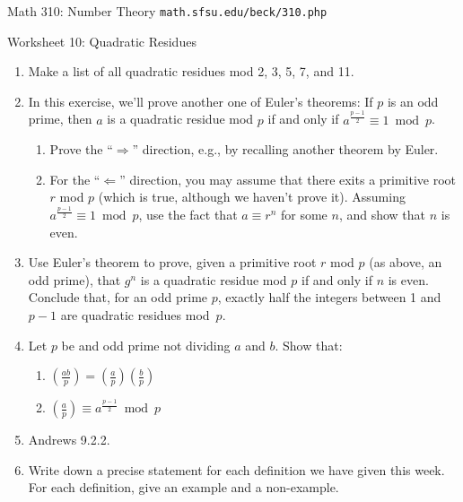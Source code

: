 \documentclass[11pt]{article}
\newcommand\leg[2]{\left( \frac{ #1 }{ #2 } \right)}
\begin{document}
\setlength{\parindent}{0pt}
\setlength{\parskip}{0.2cm}

{ Math 310: Number Theory}
\hfill
{\tt math.sfsu.edu/beck/310.php}

\vspace{.3in}

\begin{center}
\Large{Worksheet 10: Quadratic Residues}
\end{center}

\begin{enumerate}

\item Make a list of all quadratic residues mod 2, 3, 5, 7, and 11.

\item In this exercise, we'll prove another one of Euler's theorems:
If $p$ is an odd prime, then $a$ is a quadratic residue mod $p$ if and only if $a^{ \frac{ p-1 }{ 2 } } \equiv 1 \bmod p$.

  \begin{enumerate}

  \item Prove the ``$\Longrightarrow$'' direction, e.g., by recalling another theorem by Euler.

  \item For the ``$\Longleftarrow$'' direction, you may assume that there exits a primitive root $r$ mod $p$ (which is true, although we haven't prove it).
  Assuming $a^{ \frac{ p-1 }{ 2 } } \equiv 1 \bmod p$, use the fact that $a \equiv r^n$ for some $n$, and show that $n$ is even.

  \end{enumerate}

\item Use Euler's theorem to prove, given a primitive root $r$ mod $p$ (as above, an odd prime), that $g^n$ is a quadratic residue mod $p$ if and only if $n$ is even.
Conclude that, for an odd prime $p$, exactly half the integers between 1 and $p-1$ are quadratic residues mod~$p$.

\item Let $p$ be and odd prime not dividing $a$ and $b$. Show that:

  \begin{enumerate}

  \item $\leg{ab} p = \leg a p \leg b p$

  \item $\leg a p \equiv a^{ \frac{ p-1 }{ 2 } } \bmod p$
 
  \end{enumerate}

\item Andrews 9.2.2. 
 
\item Write down a precise statement for each definition we have given this week.
For each definition, give an example and a non-example.

\end{enumerate}
\end{document}
